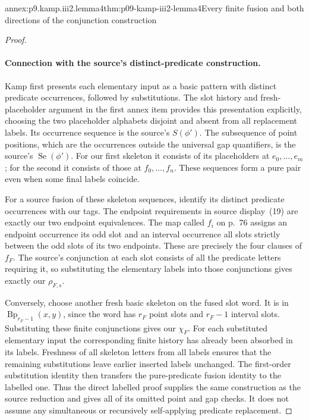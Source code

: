 \begin{annexitem}{annex:p9.kamp.iii2.lemma4}{thm:p09-kamp-iii2-lemma4}{Every finite fusion and both directions of the conjunction construction}
\begin{proof}
\paragraph{Connection with the source's distinct-predicate construction.}
Kamp first presents each elementary input as a basic pattern with
distinct predicate occurrences, followed by substitutions. The slot
history and fresh-placeholder argument in the first annex item provides
this presentation explicitly, choosing the two placeholder alphabets
disjoint and absent from all replacement labels. Its occurrence
sequence is the source's \(S(\phi')\). The subsequence of point
positions, which are the occurrences outside the universal gap
quantifiers, is the source's \(\operatorname{Se}(\phi')\).
For our first skeleton it consists of its placeholders at
\(e_0,\ldots,e_m\); for the second it consists of those at
\(f_0,\ldots,f_n\). These sequences form a pure pair even when
some final labels coincide.

For a source fusion of these skeleton sequences, identify its distinct
predicate occurrences with our tags. The endpoint requirements in source
display~(19) are exactly our two endpoint equivalences. The map called
\(f_i\) on p.~76 assigns an endpoint occurrence its odd slot and
an interval occurrence all slots strictly between the odd slots of its
two endpoints. These are precisely the four clauses of \(f_F\).
The source's conjunction at each slot consists of all the predicate
letters requiring it, so substituting the elementary labels into those
conjunctions gives exactly our \(\rho_{F,s}\).

Conversely, choose another fresh basic skeleton on the fused slot
word. It is in \(\operatorname{Bp}_{r_F-1}(x,y)\), since the word
has \(r_F\) point slots and \(r_F-1\) interval slots. Substituting
these finite conjunctions gives our \(\chi_F\).
For each substituted elementary input the corresponding finite history
has already been absorbed in its labels. Freshness of all skeleton
letters from all labels ensures that the remaining substitutions leave
earlier inserted labels unchanged. The first-order substitution identity
then transfers the pure-predicate fusion identity to the labelled one.
Thus the direct labelled proof supplies the same construction as the
source reduction and gives all of its omitted point and gap checks.
It does not assume any simultaneous or recursively self-applying
predicate replacement.


\end{proof}
\end{annexitem}
